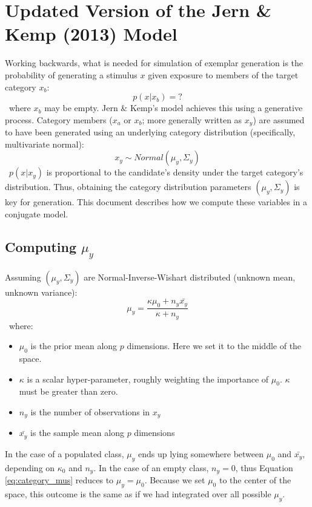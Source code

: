 \documentclass[12pt]{article}
\begin{document}
\VerbatimFootnotes

\section*{Updated Version of the Jern \& Kemp (2013) Model}

Working backwards, what is needed for simulation of exemplar generation is the probability of generating a stimulus $x$ given exposure to members of the target category $x_b$:
\
\begin{equation}
p(x | x_b) = ?
\end{equation}
\
where $x_b$ may be empty. Jern \& Kemp's model achieves this using a generative process. Category members ($x_a$ or $x_b$; more generally written as $x_y$) are assumed to have been generated using an underlying category distribution (specifically, multivariate normal):
\
\begin{equation}
  x_y \sim Normal(\mu_{y}, \Sigma_{y})
\end{equation}
\
$p(x | x_y)$ is proportional to the candidate's density under the target category's distribution. Thus, obtaining the category distribution parameters $(\mu_{y}, \Sigma_{y})$ is key for generation. This document describes how we compute these variables in a conjugate model. 

\subsection*{Computing $\mu_y$}
Assuming $(\mu_y, \Sigma_y)$ are Normal-Inverse-Wishart distributed (unknown mean, unknown variance):
\
\begin{equation}
  \mu_y = \dfrac
    {\kappa\mu_{0} + n_y \bar{x_y}}
    {\kappa + n_y}
    \label{eq:category_mus}
\end{equation}
\ 
where:
\begin{itemize}
    \setlength\itemsep{-0.5em}
    \item $\mu_{0}$ is the prior mean along $p$ dimensions. Here we set it to the middle of the space.
    \item $\kappa$ is a scalar hyper-parameter, roughly weighting the importance of $\mu_{0}$. $\kappa$ must be greater than zero.
    \item $n_y$ is the number of observations in $x_y$
    \item $\bar{x_y}$ is the sample mean along $p$ dimensions
\end{itemize}

In the case of a populated class, $\mu_{y}$ ends up lying somewhere between $\mu_{0}$ and $\bar{x_y}$, depending on $\kappa_{0}$ and $n_y$. In the case of an empty class, $n_y = 0$, thus Equation \ref{eq:category_mus} reduces to $\mu_{y} = \mu_{0}$. Because we set $\mu_0$ to the center of the space, this outcome is the same as if we had integrated over all possible $\mu_y$.
\end{document}
